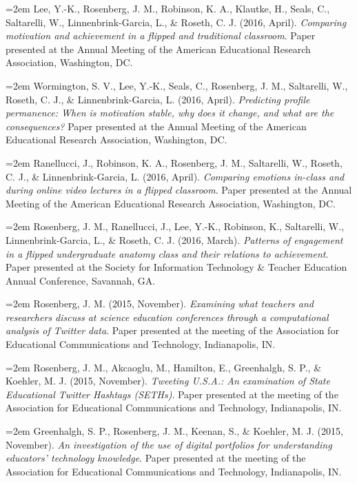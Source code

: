 \documentclass[
  14,
]{article}
\begin{document}
\hangindent=2em Lee, Y.-K., Rosenberg, J. M., Robinson, K. A., Klautke,
H., Seals, C., Saltarelli, W., Linnenbrink-Garcia, L., \& Roseth, C. J.
(2016, April). \emph{Comparing motivation and achievement in a flipped
and traditional classroom}. Paper presented at the Annual Meeting of the
American Educational Research Association, Washington, DC.

\hangindent=2em Wormington, S. V., Lee, Y.-K., Seals, C., Rosenberg, J.
M., Saltarelli, W., Roseth, C. J., \& Linnenbrink-Garcia, L. (2016,
April). \emph{Predicting profile permanence: When is motivation stable,
why does it change, and what are the consequences?} Paper presented at
the Annual Meeting of the American Educational Research Association,
Washington, DC.

\hangindent=2em Ranellucci, J., Robinson, K. A., Rosenberg, J. M.,
Saltarelli, W., Roseth, C. J., \& Linnenbrink-Garcia, L. (2016, April).
\emph{Comparing emotions in-class and during online video lectures in a
flipped classroom}. Paper presented at the Annual Meeting of the
American Educational Research Association, Washington, DC.

\hangindent=2em Rosenberg, J. M., Ranellucci, J., Lee, Y.-K., Robinson,
K., Saltarelli, W., Linnenbrink-Garcia, L., \& Roseth, C. J. (2016,
March). \emph{Patterns of engagement in a flipped undergraduate anatomy
class and their relations to achievement}. Paper presented at the
Society for Information Technology \& Teacher Education Annual
Conference, Savannah, GA.

\hangindent=2em Rosenberg, J. M. (2015, November). \emph{Examining what
teachers and researchers discuss at science education conferences
through a computational analysis of Twitter data}. Paper presented at
the meeting of the Association for Educational Communications and
Technology, Indianapolis, IN.

\hangindent=2em Rosenberg, J. M., Akcaoglu, M., Hamilton, E.,
Greenhalgh, S. P., \& Koehler, M. J. (2015, November). \emph{Tweeting
U.S.A.: An examination of State Educational Twitter Hashtags (SETHs)}.
Paper presented at the meeting of the Association for Educational
Communications and Technology, Indianapolis, IN.

\hangindent=2em Greenhalgh, S. P., Rosenberg, J. M., Keenan, S., \&
Koehler, M. J. (2015, November). \emph{An investigation of the use of
digital portfolios for understanding educators' technology knowledge}.
Paper presented at the meeting of the Association for Educational
Communications and Technology, Indianapolis, IN.
\end{document}
